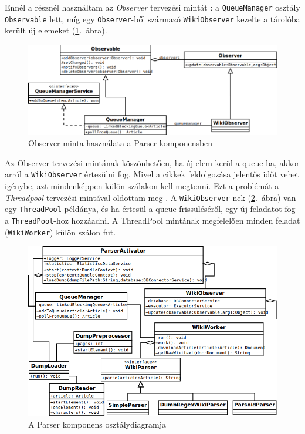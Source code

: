 Ennél a résznél használtam az \textit{Observer} tervezési mintát \cite{designpatterns}: a \texttt{QueueManager} osztály \texttt{Observable} lett, míg egy \texttt{Observer}-ből származó \texttt{WikiObserver} kezelte a tárolóba került új elemeket (\ref{fig:class_parser}.~ábra).

\begin{figure}[htp]
\centering
\includegraphics[scale=0.5]{img/class_parser}
\caption{Observer minta használata a Parser komponensben}
\label{fig:class_parser}
\end{figure}

Az Observer tervezési mintának köszönhetően, ha új elem kerül a queue-ba, akkor arról a \texttt{WikiObserver} értesülni fog. Mivel a cikkek feldolgozása jelentős időt vehet igénybe, azt mindenképpen külön szálakon kell megtenni. Ezt a problémát a \textit{Threadpool} tervezési mintával oldottam meg \cite{javaconcurrencyinpractice}. A \texttt{WikiObserver}-nek (\ref{fig:class_parser2}.~ábra) van egy \texttt{ThreadPool} példánya, és ha értesül a queue frissüléséről, egy új feladatot fog a \texttt{ThreadPool}-hoz hozzáadni. A ThreadPool mintának megfelelően minden feladat (\texttt{WikiWorker}) külön szálon fut. 

\begin{figure}[htp]
\centering
\includegraphics[scale=0.55]{img/class_parser2}
\caption{A Parser komponens osztálydiagramja}
\label{fig:class_parser2}
\end{figure}

